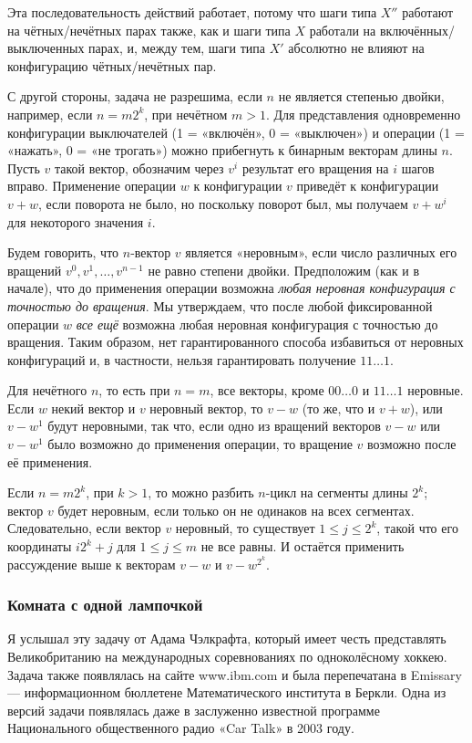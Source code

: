 Эта последовательность действий работает, потому что шаги типа $X''$ работают на чётных/нечётных парах также, как и шаги типа $X$ работали на включённых/выключенных парах, и, между тем, шаги типа $X'$ абсолютно не влияют на конфигурацию чётных/нечётных пар.
\heart

С другой стороны, задача не разрешима, если $n$ не является степенью двойки, например, если $n=m2^k$, при нечётном $m>1$.
Для представления одновременно конфигурации выключателей (1 = «включён», 0 = «выключен») и операции (1 = «нажать», 0 = «не трогать») можно прибегнуть к бинарным векторам длины $n$.
Пусть $v$ такой вектор, обозначим через $v^i$ результат его вращения на $i$ шагов вправо.
Применение операции $w$ к конфигурации $v$ приведёт к конфигурации $v+w$, если поворота не было, но поскольку поворот был, мы получаем $v+w^i$ для некоторого значения $i$.

Будем говорить, что $n$-вектор $v$ является «неровным», %
если число различных его вращений $v^0,v^1,\dots,v^{n-1}$ не равно степени двойки.
Предположим (как и в начале), что до применения операции возможна \emph{любая неровная конфигурация с точностью до вращения}.
Мы утверждаем, что после любой фиксированной операции $w$ \emph{все ещё} возможна любая неровная конфигурация с точностью до вращения.
Таким образом, нет гарантированного способа избавиться от неровных конфигураций и, в частности, нельзя гарантировать получение $11\dots1$.

Для нечётного $n$, то есть при $n=m$, все векторы, кроме $00\dots0$ и $11\dots1$ неровные.
Если $w$ некий вектор и $v$ неровный вектор, то $v-w$ (то же, что и $v+w$), или $v-w^1$ будут неровными, так что, если одно из вращений векторов $v-w$ или $v-w^1$ было возможно до применения операции, то вращение $v$ возможно после её применения.

Если $n=m2^k$, при $k>1$, то можно разбить $n$-цикл на сегменты длины $2^k$; вектор $v$ будет неровным, если только он не одинаков на всех сегментах.
Следовательно, если вектор $v$ неровный, то существует $1\le j\le 2^k$, такой что его координаты $i2^k+j$ для $1\le j\le m$ не все равны.
И остаётся применить рассуждение выше к векторам $v-w$ и $v-w^{2^k}$.

\subsubsection*{Комната с одной лампочкой}%

Я услышал эту задачу от Адама Чэлкрафта, %
который имеет честь представлять Великобританию на международных соревнованиях по одноколёсному хоккею.
Задача также появлялась на сайте www.ibm.com и была перепечатана в Emissary --- информационном бюллетене Математического института в Беркли. %
Одна из версий задачи появлялась даже в заслуженно известной программе Национального общественного радио «Car Talk» в 2003 году.


